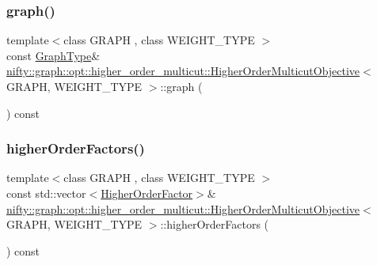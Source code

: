 \subsubsection{\texorpdfstring{graph()}{graph()}}
{\footnotesize\ttfamily template$<$class G\+R\+A\+PH , class W\+E\+I\+G\+H\+T\+\_\+\+T\+Y\+PE $>$ \\
const \hyperlink{classnifty_1_1graph_1_1opt_1_1higher__order__multicut_1_1HigherOrderMulticutObjective_a177204e42faa461d572976de69fbf3b9}{Graph\+Type}\& \hyperlink{classnifty_1_1graph_1_1opt_1_1higher__order__multicut_1_1HigherOrderMulticutObjective}{nifty\+::graph\+::opt\+::higher\+\_\+order\+\_\+multicut\+::\+Higher\+Order\+Multicut\+Objective}$<$ G\+R\+A\+PH, W\+E\+I\+G\+H\+T\+\_\+\+T\+Y\+PE $>$\+::graph (\begin{DoxyParamCaption}{ }\end{DoxyParamCaption}) const\hspace{0.3cm}{\ttfamily [inline]}}

\mbox{\label{classnifty_1_1graph_1_1opt_1_1higher__order__multicut_1_1HigherOrderMulticutObjective_a81baae1ee2a1463b28e964f8c027960a}} 
\subsubsection{\texorpdfstring{higher\+Order\+Factors()}{higherOrderFactors()}}
{\footnotesize\ttfamily template$<$class G\+R\+A\+PH , class W\+E\+I\+G\+H\+T\+\_\+\+T\+Y\+PE $>$ \\
const std\+::vector$<$\hyperlink{classnifty_1_1graph_1_1opt_1_1higher__order__multicut_1_1HigherOrderFactor}{Higher\+Order\+Factor}$>$\& \hyperlink{classnifty_1_1graph_1_1opt_1_1higher__order__multicut_1_1HigherOrderMulticutObjective}{nifty\+::graph\+::opt\+::higher\+\_\+order\+\_\+multicut\+::\+Higher\+Order\+Multicut\+Objective}$<$ G\+R\+A\+PH, W\+E\+I\+G\+H\+T\+\_\+\+T\+Y\+PE $>$\+::higher\+Order\+Factors (\begin{DoxyParamCaption}{ }\end{DoxyParamCaption}) const\hspace{0.3cm}{\ttfamily [inline]}}

